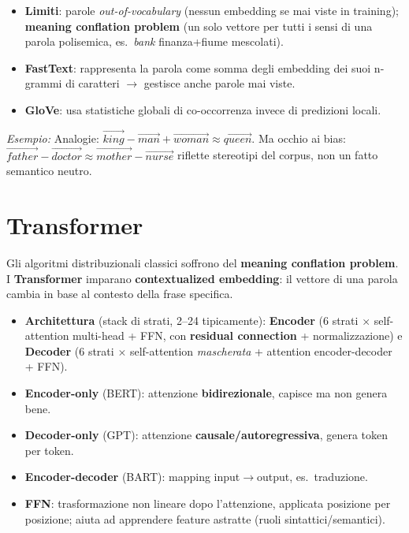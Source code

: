 \documentclass[11pt,a4paper]{article}
\newcommand{\es}[1]{\begin{esbox}\textit{Esempio:} #1\end{esbox}}
\begin{document}
\begin{itemize}
  \item \textbf{Limiti}: parole \emph{out-of-vocabulary} (nessun embedding se mai viste in training); \textbf{meaning conflation problem} (un solo vettore per tutti i sensi di una parola polisemica, es.\ \textit{bank} finanza+fiume mescolati).
  \item \textbf{FastText}: rappresenta la parola come somma degli embedding dei suoi n-grammi di caratteri $\to$ gestisce anche parole mai viste.
  \item \textbf{GloVe}: usa statistiche globali di co-occorrenza invece di predizioni locali.
\end{itemize}

\es{Analogie: $\vec{king}-\vec{man}+\vec{woman}\approx \vec{queen}$. Ma occhio ai bias: $\vec{father}-\vec{doctor}\approx\vec{mother}-\vec{nurse}$ riflette stereotipi del corpus, non un fatto semantico neutro.}

\section{Transformer}

Gli algoritmi distribuzionali classici soffrono del \textbf{meaning conflation problem}. I \textbf{Transformer} imparano \textbf{contextualized embedding}: il vettore di una parola cambia in base al contesto della frase specifica.

\begin{itemize}
  \item \textbf{Architettura} (stack di strati, 2--24 tipicamente): \textbf{Encoder} (6 strati $\times$ self-attention multi-head + FFN, con \textbf{residual connection} + normalizzazione) e \textbf{Decoder} (6 strati $\times$ self-attention \emph{mascherata} + attention encoder-decoder + FFN).
  \item \textbf{Encoder-only} (BERT): attenzione \textbf{bidirezionale}, capisce ma non genera bene.
  \item \textbf{Decoder-only} (GPT): attenzione \textbf{causale/autoregressiva}, genera token per token.
  \item \textbf{Encoder-decoder} (BART): mapping input$\to$output, es.\ traduzione.
  \item \textbf{FFN}: trasformazione non lineare dopo l'attenzione, applicata posizione per posizione; aiuta ad apprendere feature astratte (ruoli sintattici/semantici).
\end{itemize}
\end{document}
